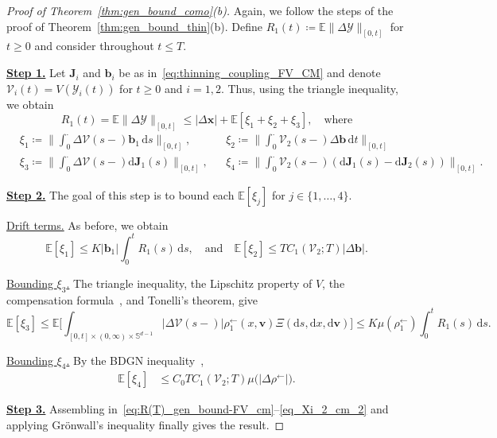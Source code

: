 \documentclass[en,oneside,bbfont,article]{amsart}
\theoremstyle{remark}
\theoremstyle{definition}
\theoremstyle{definition}
\newcommand\Y{\bm{\mathcal{Y}}}
\newcommand{\V}{\bm{\mathcal{V}}}
\newcommand\Sp{\mathbb{S}}
\newcommand\E{\mathds{E}}
\newcommand\1{\mathds{1}}
\newcommand\la{\leftarrow}
\renewcommand\le{\leqslant}
\renewcommand\ge{\geqslant}
\newcommand{\D}{\mathrm{d}}
\begin{document}
\begin{proof}[Proof of Theorem~\ref{thm:gen_bound_como}(b)]
Again, we follow the steps of the proof of Theorem~\ref{thm:gen_bound_thin}(b). Define $R_1(t)\coloneqq \E\|\Delta\Y\|_{[0,t]}$ for $t\ge 0$ and consider throughout $t\le T$. 

\underline{\textbf{Step 1.}} 
Let $\bm{J}_i$ and $\bm{b}_i$ be as in~\eqref{eq:thinning_coupling_FV_CM} and denote $\V_i(t)=V(\Y_i(t))$ for $t\ge 0$ and $i=1,2$. Thus, using the triangle inequality, we obtain
\begin{equation}
R_1(t)=\E\|\Delta \Y\|_{[0,t]}
\le |\Delta\bm{x}|+\E[\xi_1+\xi_2+\xi_3],
\quad\text{where}\label{eq:R(T)_gen_bound-FV_cm}
\end{equation}
\vspace{-7mm}
\begin{align*}
&\xi_1\coloneqq
\bigg\|\int_0^\cdot \Delta\V(s-)\bm{b}_1\,\D s\bigg\|_{[0,t]},  
&&\xi_2\coloneqq
\bigg\|\int_0^\cdot \V_2(s-)\Delta\bm{b}\,\D t\bigg\|_{[0,t]}\\
&\xi_3 \coloneqq \bigg\|\int_0^\cdot \Delta\V(s-)\D\bm{J}_1(s)\bigg\|_{[0,t]},
&&\xi_4\coloneqq \bigg\|\int_0^\cdot \V_2(s-)(\D\bm{J}_1(s)-\D\bm{J}_2(s))\bigg\|_{[0,t]}.
\end{align*} 

\underline{\textbf{Step 2.}}
The goal of this step is to bound each $\E[\xi_j]$ for $j\in\{1,\ldots,4\}$. 

{\underline{Drift terms.}} As before, we obtain
\begin{equation}
\label{eq:xi1-FV_cm}
\E[\xi_{1}]
\le K|\bm{b}_1|\int_0^t R_1(s)\,\D s, 
\quad \text{and} \quad 
\E[\xi_{2}]
\le TC_1(\V_2;T)|\Delta\bm{b}|.
\end{equation} 

{\underline{Bounding $\xi_3$.}} 
The triangle inequality, the Lipschitz property of $V$, the compensation formula~\cite[Thm~10.21]{MR4226142}, and Tonelli's theorem, give
\begin{equation}
\label{eq:xi_3-middle-step-FV_cm}
\E[\xi_3] 
\le\E\Bigg[\int_{[0,t]\times (0,\infty) \times \Sp^{d-1}}|\Delta\V(s-)| \rho^{\la}_1(x,\bm{v}) \Xi(\D s,\D x,\D\bm{v})\Bigg]
\le K\mu(\rho_1^\la) \int_0^t R_1(s)\, \D s.
\end{equation} 

{\underline{Bounding $\xi_4$.}} 
By the BDGN inequality~\cite[Thm~1(b)]{MR394861}, 
\begin{align}\label{eq_Xi_2_cm_2}
\E[\xi_4]%
&\le C_0 T C_1(\V_2;T) \mu\big(|\Delta\rho^{\la}|\big).
\end{align}

\underline{\textbf{Step 3.}} Assembling in~\eqref{eq:R(T)_gen_bound-FV_cm}--\eqref{eq_Xi_2_cm_2} and applying Gr\"onwall's inequality finally gives the result.
\end{proof}
\end{document}

